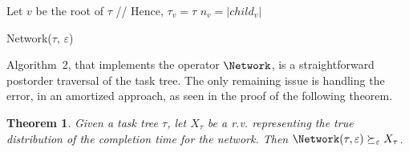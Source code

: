 \documentclass{article}
\newtheorem{theorem}{Theorem}
\begin{document}
\begin{algorithm}
  \DontPrintSemicolon
  
  
  {

 Let $v$ be the root of $\tau$  // Hence, $\tau_v=\tau$ \;
	$n_v = |child_v|$ \;
	
			
  }
  
\caption{Network($\tau$, $\varepsilon$) }\label{alg:approx}
  
\end{algorithm}


Algorithm~2, that implements the operator $\Network$, is a straightforward postorder traversal of the task tree. The only remaining issue is handling the error,  in an amortized approach, as seen in the proof of the following theorem.

\begin{theorem}\label{th:TNapprox}
Given a task tree $\tau$, let $X_{\tau}$ be a r.v. representing the true
distribution of the completion time for the network. Then $\Network (\tau , \varepsilon)\succeq_\varepsilon X_{\tau}$.
\end{theorem}
\end{document}
